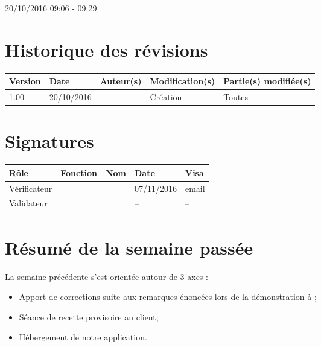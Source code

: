 \documentclass [a4paper] {article}
\begin{document}
20/10/2016			 				%
\hfill   
\hfill 	 09:06 - 09:29				%


\section*{Historique des révisions}
\begin{center}
			\begin{tabular}{| p{2.5cm} | p{3cm} | p{3cm} | p{3cm} | p{3.5cm} |}
				\hline
				\rowcolor{Gray}
				Version & Date & Auteur(s) & Modification(s) & Partie(s) modifiée(s)		 \\
				\hline
				1.00 & 20/10/2016 & \Kafui & Création & Toutes \\
				\hline			
			\end{tabular}
		\end{center}

\section*{Signatures}

		\begin{center}
			\begin{tabular}{| p{2.5cm} | p{4cm} | p{3cm} | p{3cm} | p{2.5cm} |}
				\hline
				\rowcolor{Gray}
				Rôle & Fonction & Nom & Date & Visa		 \\
				\hline
				Vérificateur & \RGC & \Melissa & 07/11/2016 & email \\[30pt]
				\hline
				Validateur & \CP & \Pierre &  -- & -- \\[30pt]	
				\hline
			\end{tabular}
		\end{center}

\section{Résumé de la semaine passée}
La semaine précédente s'est orientée autour de 3 axes :  
\begin{itemize}
	\item Apport de corrections suite aux remarques énoncées lors de la démonstration à 		\nomTuteurPedago;
	\item Séance de recette provisoire au client;
	\item Hébergement de notre application.
\end{itemize} 
\end{document}
